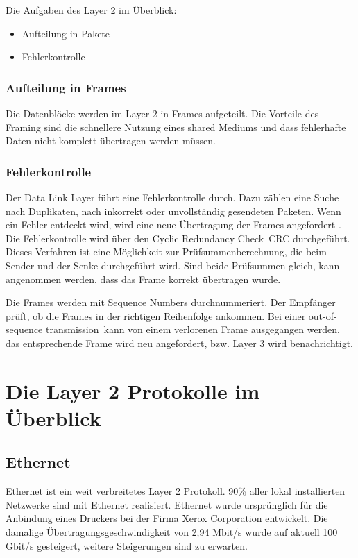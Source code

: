 \documentclass[12pt, a4paper, ngerman]{article}
\begin{document}
Die Aufgaben des Layer 2 im Überblick:
\begin{itemize}
	\item Aufteilung in Pakete
	\item Fehlerkontrolle
\end{itemize} 

\subsubsection{Aufteilung in Frames}
Die Datenblöcke werden im Layer 2 in Frames aufgeteilt. Die Vorteile des Framing sind die schnellere Nutzung eines shared Mediums und dass fehlerhafte Daten nicht komplett übertragen werden müssen.
\subsubsection{Fehlerkontrolle}
Der Data Link Layer führt eine Fehlerkontrolle durch. Dazu zählen eine Suche nach Duplikaten, nach inkorrekt oder unvollständig gesendeten Paketen. Wenn ein Fehler entdeckt wird, wird eine neue Übertragung der Frames angefordert \cite[S. 91]{SWB-107223570}. Die Fehlerkontrolle wird über den \glqq Cyclic Redundancy Check\grqq ~CRC durchgeführt. Dieses Verfahren ist eine Möglichkeit zur Prüfsummenberechnung, die beim Sender und der Senke durchgeführt wird. Sind beide Prüfsummen gleich, kann angenommen werden, dass das Frame korrekt übertragen wurde. 

Die Frames werden mit Sequence Numbers durchnummeriert. Der Empfänger prüft, ob die Frames in der richtigen Reihenfolge ankommen. Bei einer \glqq out-of-sequence transmission\grqq ~kann von einem verlorenen Frame ausgegangen werden, das entsprechende Frame wird neu angefordert, bzw. Layer 3 wird benachrichtigt.
\section{Die Layer 2 Protokolle im Überblick}

\subsection{Ethernet}
Ethernet ist ein weit verbreitetes Layer 2 Protokoll. 90\% aller lokal installierten Netzwerke sind mit Ethernet realisiert\cite{SWB-097965316}. Ethernet wurde ursprünglich für die Anbindung eines Druckers bei der Firma Xerox Corporation entwickelt. Die damalige Übertragungsgeschwindigkeit von 2,94 Mbit/s wurde auf aktuell 100 Gbit/s gesteigert, weitere Steigerungen sind zu erwarten.
\end{document}
